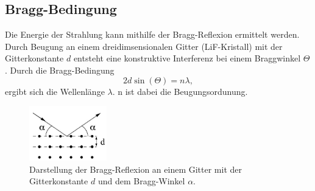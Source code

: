 \subsection{Bragg-Bedingung}
Die Energie der Strahlung kann mithilfe der Bragg-Reflexion ermittelt werden.
Durch Beugung an einem dreidimsensionalen Gitter (LiF-Kristall) mit der Gitterkonstante $d$ 
entsteht eine konstruktive Interferenz bei einem Braggwinkel $\Theta$. Durch die Bragg-Bedingung
\begin{equation}
    2 d \sin(\Theta)=n\lambda,
    \label{eqn:bragg}
\end{equation}
ergibt sich die Wellenlänge $\lambda$. n ist dabei die Beugungsordunung.
\begin{figure}
    \centering
    \includegraphics[width=0.3\textwidth]{plots/bragg.jpg}
    \caption{Darstellung der Bragg-Reflexion an einem Gitter mit der
    Gitterkonstante $d$ und dem Bragg-Winkel $\alpha$.\cite[3]{anleitung}}
\end{figure}


